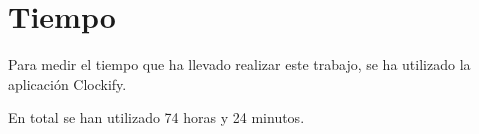 
        \section{Tiempo} %
        \label{sec:Tiempo}

            Para medir el tiempo que ha llevado realizar este trabajo, se ha utilizado la aplicación
            Clockify\cite{clockify}.\newline

            En total se han utilizado 74 horas y 24 minutos.%


